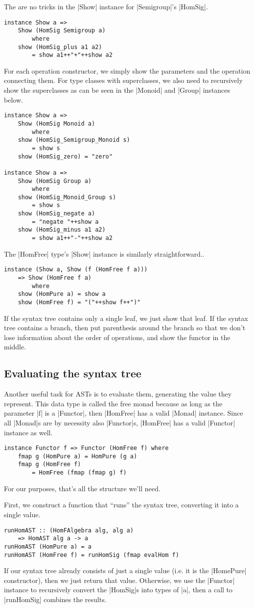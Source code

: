 \documentclass[preprint]{sigplanconf}
\theoremstyle{definition}
\begin{document}
The are no tricks in the |Show| instance for |Semigroup|'s |HomSig|.
\begin{lstlisting}
instance Show a =>
    Show (HomSig Semigroup a)
        where
    show (HomSig_plus a1 a2)
        = show a1++"+"++show a2
\end{lstlisting}
For each operation constructor, we simply show the parameters and the operation connecting them.
For type classes with superclasses, we also need to recursively show the superclasses as can be seen in the |Monoid| and |Group| instances below.
\begin{lstlisting}
instance Show a =>
    Show (HomSig Monoid a)
        where
    show (HomSig_Semigroup_Monoid s)
        = show s
    show (HomSig_zero) = "zero"

instance Show a =>
    Show (HomSig Group a)
        where
    show (HomSig_Monoid_Group s)
        = show s
    show (HomSig_negate a)
        = "negate "++show a
    show (HomSig_minus a1 a2)
        = show a1++"-"++show a2
\end{lstlisting}
The |HomFree| type's |Show| instance is similarly straightforward..
\begin{lstlisting}
instance (Show a, Show (f (HomFree f a)))
    => Show (HomFree f a)
        where
    show (HomPure a) = show a
    show (HomFree f) = "("++show f++")"
\end{lstlisting}
If the syntax tree contains only a single leaf, we just show that leaf.
If the syntax tree contains a branch,
then put parenthesis around the branch so that we don't lose information about the order of operations, and show the functor in the middle.

\subsection{Evaluating the syntax tree}
Another useful task for ASTs is to evaluate them,
generating the value they represent.
This data type is called the free monad because as long as the parameter |f| is a |Functor|,
then |HomFree| has a valid |Monad| instance.
Since all |Monad|s are by necessity also |Functor|s,
|HomFree| has a valid |Functor| instance as well.
\begin{lstlisting}
instance Functor f => Functor (HomFree f) where
    fmap g (HomPure a) = HomPure (g a)
    fmap g (HomFree f)
        = HomFree (fmap (fmap g) f)
\end{lstlisting}
For our purposes, that's all the structure we'll need.

First, we construct a function that ``runs'' the syntax tree, converting it into a single value.
\begin{lstlisting}
runHomAST :: (HomFAlgebra alg, alg a)
    => HomAST alg a -> a
runHomAST (HomPure a) = a
runHomAST (HomFree f) = runHomSig (fmap evalHom f)
\end{lstlisting}
If our syntax tree already consists of just a single value (i.e. it is the |HomePure| constructor),
then we just return that value.
Otherwise, we use the |Functor| instance to recursively convert the |HomSig|s into types of |a|, then a call to |runHomSig| combines the results.
\end{document}
